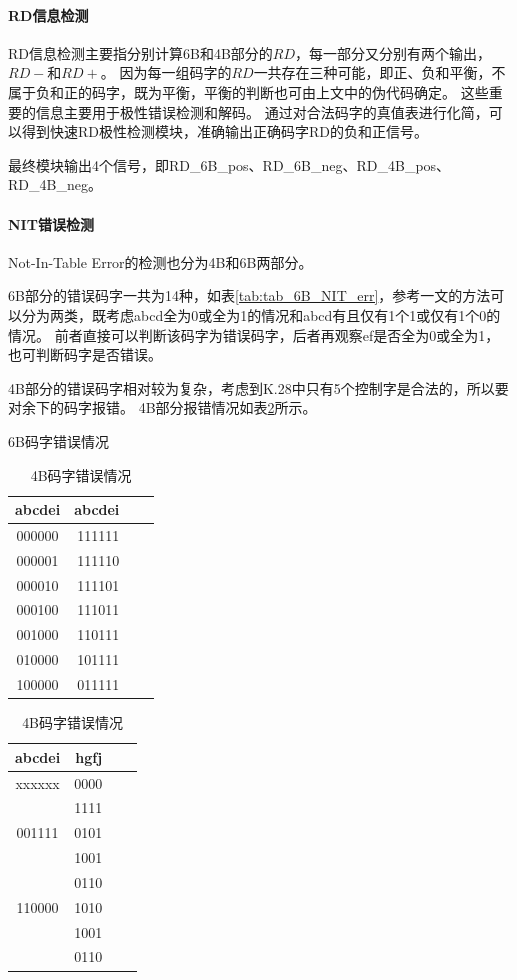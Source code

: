 \documentclass[UTF8]{ctexart}
\begin{document}
\paragraph{RD信息检测}

RD信息检测主要指分别计算6B和4B部分的$RD$，每一部分又分别有两个输出，$RD-$和$RD+$。
因为每一组码字的$RD$一共存在三种可能，即正、负和平衡，不属于负和正的码字，既为平衡，平衡的判断也可由上文中的伪代码确定。
这些重要的信息主要用于极性错误检测和解码。
通过对合法码字的真值表进行化简，可以得到快速RD极性检测模块，准确输出正确码字RD的负和正信号。

最终模块输出4个信号，即RD\_6B\_pos、RD\_6B\_neg、RD\_4B\_pos、RD\_4B\_neg。

\paragraph{NIT错误检测}

Not-In-Table Error的检测也分为4B和6B两部分。

6B部分的错误码字一共为14种，如表\ref{tab:tab_6B_NIT_err}，参考\cite{Widmer1983}一文的方法可以分为两类，既考虑abcd全为0或全为1的情况和abcd有且仅有1个1或仅有1个0的情况。
前者直接可以判断该码字为错误码字，后者再观察ef是否全为0或全为1，也可判断码字是否错误。

4B部分的错误码字相对较为复杂，考虑到K.28中只有5个控制字是合法的，所以要对余下的码字报错。
4B部分报错情况如表\ref{tab:tab_4B_NIT_err}所示。

\begin{table}[H]
\begin{minipage}[t]{.5\textwidth}
\centering
\caption{6B码字错误情况}
\label{tab:tab_6B_NIT_err}
\begin{tabular}{|c|r|r|r|}
\hline
	abcdei	&	abcdei	\\
\hline
	000000	&	111111	\\
	000001	&	111110	\\
	000010	&	111101	\\
	000100	&	111011	\\
	001000	&	110111	\\
	010000	&	101111	\\
	100000	&	011111	\\
\hline
\end{tabular}
\end{minipage}
\begin{minipage}[t]{.5\textwidth}
\centering
\caption{4B码字错误情况}
\label{tab:tab_4B_NIT_err}
\begin{tabular}{|c|r|r|r|}
\hline
	abcdei	&	hgfj	\\
\hline
	xxxxxx	&	0000	\\
			&	1111	\\
\hline
	001111	&	0101	\\
			&	1001	\\
			&	0110	\\
\hline
	110000	&	1010	\\
			&	1001	\\
			&	0110	\\
\hline
\end{tabular}
\end{minipage}
\end{table}
\end{document}
